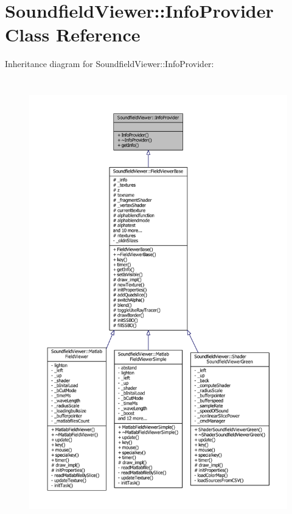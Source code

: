 \section{Soundfield\-Viewer\-:\-:Info\-Provider Class Reference}
\label{classSoundfieldViewer_1_1InfoProvider}


Inheritance diagram for Soundfield\-Viewer\-:\-:Info\-Provider\-:\nopagebreak
\begin{figure}[H]
\begin{center}
\leavevmode
\includegraphics[height=550pt]{db/d73/classSoundfieldViewer_1_1InfoProvider__inherit__graph}
\end{center}
\end{figure}


